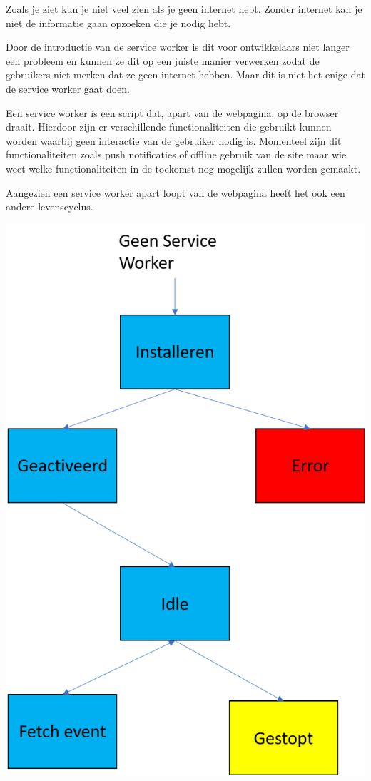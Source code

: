 Zoals je ziet kun je niet veel zien als je geen internet hebt. Zonder internet kan je niet de informatie gaan opzoeken die je nodig hebt.

Door de introductie van de service worker is dit voor ontwikkelaars niet langer een probleem en kunnen ze dit op een juiste manier verwerken zodat de gebruikers niet merken dat ze geen internet hebben. Maar dit is niet het enige dat de service worker gaat doen.

Een service worker is een script dat, apart van de webpagina, op de browser draait. Hierdoor zijn er verschillende functionaliteiten die gebruikt kunnen worden waarbij geen interactie van de gebruiker nodig is. Momenteel zijn dit functionaliteiten zoals push notificaties of offline gebruik van de site maar wie weet welke functionaliteiten in de toekomst nog mogelijk zullen worden gemaakt. 


Aangezien een service worker apart loopt van de webpagina heeft het ook een andere levenscyclus. 

	\includegraphics[scale=0.5]{img/lifeCycle.png}
	
